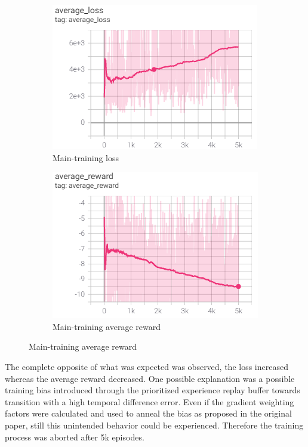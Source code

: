 \begin{figure}[ht]
	\centering
	\begin{subfigure}[b]{0.49\textwidth}
		\centering
		\includegraphics[width=\textwidth]{figures/training1-main-loss-smooth.PNG}
		\caption{Main-training loss}
		\label{fig:main-loss-smoothed-1}
	\end{subfigure}
	\hfill
	\begin{subfigure}[b]{0.49\textwidth}
		\centering
		\includegraphics[width=\textwidth]{figures/training1-main-reward-smooth.PNG}
		\caption{Main-training average reward}
		\label{fig:main-reward-smoothed-1}
	\end{subfigure}
\end{figure}

The complete opposite of what was expected was observed, the loss increased whereas the average reward decreased. One possible explanation was a possible training bias introduced through the prioritized experience replay buffer towards transition with a high temporal difference error. Even if the gradient weighting factors were calculated and used to anneal the bias as proposed in the original paper, still this unintended behavior could be experienced. Therefore the training process was aborted after 5k episodes. 

